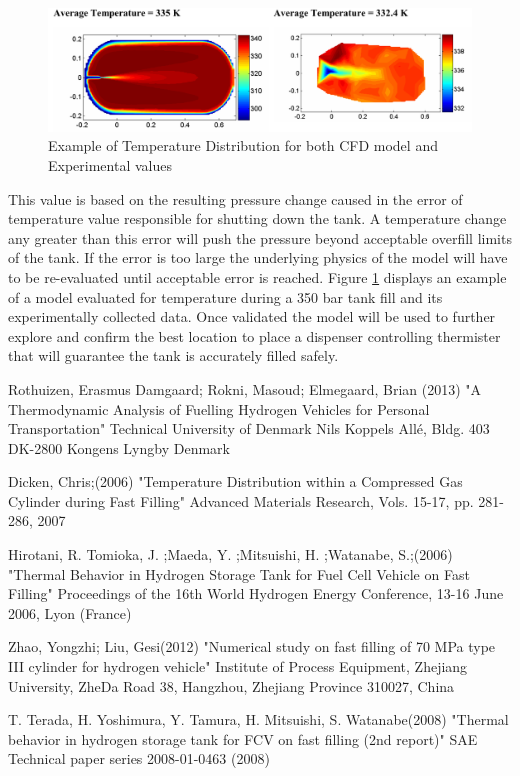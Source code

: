 \documentclass[paper=a4, fontsize=11pt, abstract=on]{scrartcl}
\numberwithin{equation}{section}		%
\numberwithin{figure}{section}			%
\numberwithin{table}{section}				%
\begin{document}
\begin{figure}[H]
\centering
\includegraphics[width=1.0\linewidth]{fin}
\caption{Example of Temperature Distribution for both CFD model and Experimental values \cite{dick}}
\label{fin}
\end{figure} 

This value is based on the resulting pressure change caused in the error of temperature value responsible for shutting down the tank. A temperature change any greater than this error will push the pressure beyond acceptable overfill limits of the tank. If the error is too large the underlying physics of the model will have to be re-evaluated until acceptable error is reached. Figure \ref{fin} displays an example of a model evaluated for temperature during a 350 bar tank fill and its experimentally collected data. Once validated the model will be used to further explore and confirm the best location to place a dispenser controlling thermister that will guarantee the tank is accurately filled safely.




\newpage

\begin{thebibliography}{99} %
 Rothuizen, Erasmus Damgaard; Rokni, Masoud; Elmegaard, Brian (2013)
\newblock "A Thermodynamic Analysis of Fuelling Hydrogen Vehicles for Personal Transportation" Technical University of Denmark
\newblock Nils Koppels Allé, Bldg. 403 DK-2800 Kongens Lyngby Denmark


 Dicken, Chris;(2006)
\newblock "Temperature Distribution within a Compressed Gas Cylinder during Fast Filling"
\newblock  Advanced Materials Research, Vols. 15-17, pp. 281-286, 2007 


 Hirotani, R.
Tomioka, J. ;Maeda, Y. ;Mitsuishi, H. ;Watanabe, S.;(2006)
\newblock "Thermal Behavior in Hydrogen Storage Tank for Fuel Cell Vehicle on Fast Filling"
\newblock  Proceedings of the 16th World Hydrogen Energy Conference, 13-16 June 2006, Lyon (France)

 Zhao, Yongzhi; Liu, Gesi(2012)
\newblock "Numerical study on fast filling of 70 MPa type III cylinder for hydrogen vehicle"
\newblock  Institute of Process Equipment, Zhejiang University, ZheDa Road 38, Hangzhou, Zhejiang Province 310027, China

 T. Terada, H. Yoshimura, Y. Tamura, H. Mitsuishi, S. Watanabe(2008)
\newblock "Thermal behavior in hydrogen storage tank for FCV on fast filling (2nd report)"
\newblock  SAE Technical paper series 2008-01-0463 (2008)

\newpage
\end{thebibliography}
\end{document}
